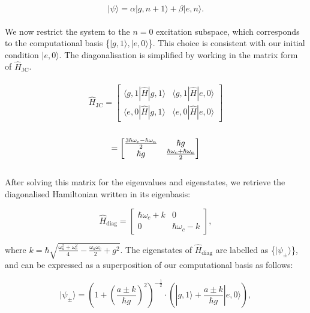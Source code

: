 \documentclass[12pt]{article}
\begin{document}
\begin{equation*}
    |\psi\rangle = \alpha|g,n+1\rangle + \beta|e,n\rangle.
\end{equation*}
\\
We now restrict the system to the $n=0$ excitation subspace, which corresponds to the computational basis \small{\{$|g,1\rangle,|e,0\rangle$\}}. This choice is consistent with our initial condition $|e,0\rangle$. The diagonalisation is simplified by working in the matrix form of $\hat{H}_{\scriptscriptstyle \text{JC}}$.\\
\\
\begin{equation*}
    \hat{H}_{\scriptscriptstyle \text{JC}} = 
    \begin{bmatrix}
        \langle g,1|\hat{H}|g,1\rangle & \langle g,1|\hat{H}|e,0\rangle\\
        \langle e,0|\hat{H}|g,1\rangle & \langle e,0|\hat{H}|e,0\rangle
    \end{bmatrix}
\end{equation*}
\\
\begin{equation*}
=
    \begin{bmatrix}
        \large{\frac{3\hbar\omega_c - \hbar\omega_a}{2}} & \small{\hbar g} \\
        \small{\hbar g} & \large{\frac{\hbar\omega_c + \hbar\omega_a}{2}}
    \end{bmatrix}
\end{equation*}
\\
After solving this matrix for the eigenvalues and eigenstates, we retrieve the diagonalised Hamiltonian written in its eigenbasis:

\begin{equation*}
    \hat{H}_{\scriptscriptstyle \text{diag}} = 
    \begin{bmatrix}
        \hbar\omega_c + k & 0 \\
        0 & \hbar\omega_c - k
    \end{bmatrix},
\end{equation*}

where $k = \hbar\sqrt{\frac{\omega_a^2 + \omega_c^2}{4} - \frac{\omega_a\omega_c}{2} + g^2}$. The eigenstates of $\hat{H}_{\scriptscriptstyle \text{diag}}$ are labelled as \{$|\psi_\pm\rangle$\}, and can be expressed as a superposition of our computational basis as follows:

\begin{equation*}
    |\psi_\pm\rangle = \left(1 + \left(\frac{a\pm k}{\hbar g}\right)^2\right)^{-\frac{1}{2}} \cdot\left(|g,1\rangle + \frac{a\pm k}{\hbar g}|e,0\rangle\right),
\end{equation*}
\end{document}
